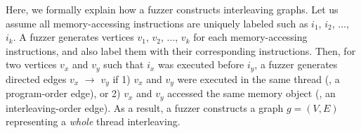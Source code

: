 %


%



%
%
Here, we formally explain how a fuzzer constructs interleaving
graphs. Let us assume all memory-accessing instructions are uniquely
labeled such as $i_1$, $i_2$, ..., $i_k$.
%
A fuzzer generates vertices $v_1$, $v_2$, ..., $v_k$ for each
memory-accessing instructions, and also label them with their
corresponding instructions.
%
Then, for two vertices $v_x$ and $v_y$ such that $i_x$ was executed
before $i_y$, a fuzzer generates directed edges $v_x$ $\rightarrow$
$v_y$ if 1) $v_x$ and $v_y$ were executed in the same thread (\ie, a
program-order edge), or 2) $v_x$ and $v_y$ accessed the same memory
object (\ie, an interleaving-order edge).
%
As a result, a fuzzer constructs a graph $g = (V, E)$ representing a
\textit{whole} thread interleaving.



